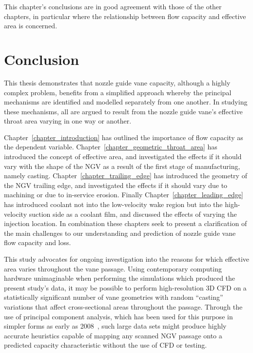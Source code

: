 \documentclass[a4paper, 11pt, oneside]{report}
\begin{document}
This chapter's conclusions are in good agreement with those of the other chapters, in particular where the relationship between flow capacity and effective area is concerned. 



\chapter{Conclusion}


This thesis demonstrates that nozzle guide vane capacity, although a highly complex problem, benefits from a simplified approach whereby the principal mechanisms are identified and modelled separately from one another. In studying these mechanisms, all are argued to result from the nozzle guide vane's effective throat area varying in one way or another.

Chapter~\ref{chapter_introduction} has outlined the importance of flow capacity as the dependent variable. Chapter~\ref{chapter_geometric_throat_area} has introduced the concept of effective area, and investigated the effects if it should vary with the shape of the NGV as a result of the first stage of manufacturing, namely casting. Chapter~\ref{chapter_trailing_edge} has introduced the geometry of the NGV trailing edge, and investigated the effects if it should vary due to machining or due to in-service erosion. Finally Chapter~\ref{chapter_leading_edge} has introduced coolant not into the low-velocity wake region but into the high-velocity suction side as a coolant film, and discussed the effects of varying the injection location. In combination these chapters seek to present a clarification of the main challenges to our understanding and prediction of nozzle guide vane flow capacity and loss.

This study advocates for ongoing investigation into the reasons for which effective area varies throughout the vane passage. Using contemporary computing hardware unimaginable when performing the simulations which produced the present study's data, it may be possible to perform high-resolution 3D CFD on a statistically significant number of vane geometries with random ``casting'' variations that affect cross-sectional areas throughout the passage. Through the use of principal component analysis, which has been used for this purpose in simpler forms as early as 2008~\cite{duffner_manufacturing_variability}, such large data sets might produce highly accurate heuristics capable of mapping any scanned NGV passage onto a predicted capacity characteristic without the use of CFD or testing. 
\end{document}
